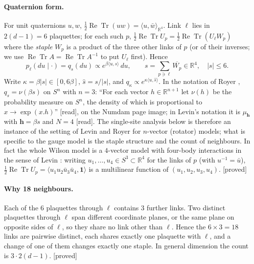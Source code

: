 \documentclass[11pt,a4paper]{article}
\theoremstyle{remark}
\theoremstyle{definition}
\theoremstyle{plain}
\theoremstyle{remark}
\newcommand{\R}{\mathbb{R}}
\newcommand{\ReTr}{\operatorname{Re}\operatorname{Tr}}
\newcommand{\st}[1]{\textsf{[#1]}}
\begin{document}
\paragraph{Quaternion form.} For unit quaternions $u,w$, $\tfrac12\ReTr(uw)=\langle u,\bar w\rangle_{\R^4}$.
Link $\ell$ lies in $2(d-1)=6$ plaquettes; for each such $p$, $\tfrac12\ReTr U_p=\tfrac12\ReTr(U_\ell W_p)$
where the \emph{staple} $W_p$ is a product of the three other links of $p$ (or of their inverses; we use
$\ReTr A=\ReTr A^{-1}$ to put $U_\ell$ first). Hence
\begin{equation}\label{eq:q}
  p_\ell(du\mid\cdot)=q_s(du)\propto e^{\beta\langle u,s\rangle}\,du,\qquad
  s=\sum_{p\ni\ell}\overline{W_p}\in\R^4,\quad |s|\le 6 .
\end{equation}
Write $\kappa=\beta|s|\in[0,6\beta]$, $\hat s=s/|s|$, and $q_\kappa\propto e^{\kappa\langle u,\hat s\rangle}$.
In the notation of Royer \cite[p.~31]{Roy86}, $q_s=\nu(\beta s)$ on $S^n$ with $n=3$: ``For each vector
$h\in\R^{n+1}$ let $\nu(h)$ be the probability measure on $S^n$, the density of which is proportional to
$x\to\exp(x.h)$'' \st{read}, on the Numdam page image; in Levin's notation \cite[(3.11), p.~68]{Lev80} it is
$\mu_{\mathbf h}$ with $\mathbf h=\beta s$ and $N=4$ \st{read}. The single-site analysis below is therefore an
instance of the setting of Levin \cite{Lev80} and Royer \cite{Roy86} for $n$-vector (rotator) models; what
is specific to the gauge model is the staple structure and the count of neighbours. In fact the whole
Wilson model is a $4$-vector model with four-body interactions in the sense of Levin
\cite[Remark~3.6, (3.48), p.~73]{Lev80}: writing $u_1,\dots,u_4\in S^3\subset\R^4$ for the links of $p$ (with
$u^{-1}=\bar u$), $\tfrac12\ReTr U_p=\langle u_1u_2\bar u_3\bar u_4,\mathbf 1\rangle$ is a multilinear function of
$(u_1,u_2,u_3,u_4)$. \st{proved}

\paragraph{Why 18 neighbours.} Each of the $6$ plaquettes through $\ell$ contains $3$ further links.
Two distinct plaquettes through $\ell$ span different coordinate planes, or the same plane on opposite
sides of $\ell$, so they share no link other than $\ell$. Hence the $6\times3=18$ links are pairwise
distinct, each shares exactly one plaquette with $\ell$, and a change of one of them changes exactly one
staple. In general dimension the count is $3\cdot2(d-1)$. \st{proved}
\end{document}
